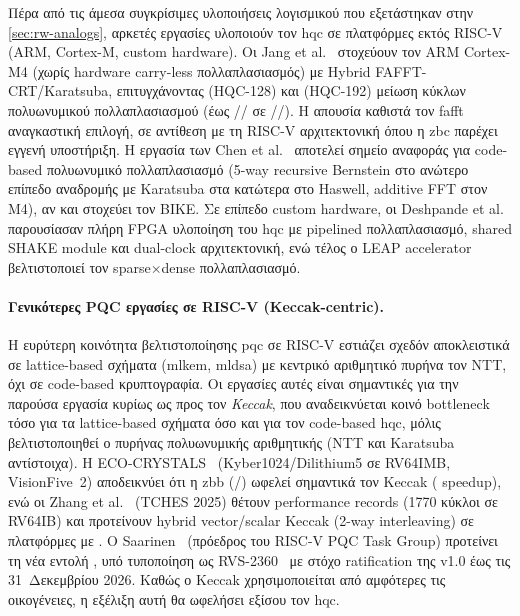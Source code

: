 Πέρα από τις άμεσα συγκρίσιμες υλοποιήσεις λογισμικού που εξετάστηκαν στην \cref{sec:rw-analogs}, αρκετές εργασίες
υλοποιούν τον \gls{hqc} σε πλατφόρμες εκτός RISC-V (ARM, Cortex-M, custom hardware). Οι Jang et
al.~\cite{Jang2025-CortexM4-HQC} στοχεύουν τον ARM Cortex-M4 (χωρίς hardware
carry-less πολλαπλασιασμός) με Hybrid FAFFT-CRT/Karatsuba, επιτυγχάνοντας 
(HQC-128) και  (HQC-192) μείωση κύκλων πολυωνυμικού πολλαπλασιασμού (έως
// σε \KeyGen/\Encaps/\Decaps). Η απουσία 
καθιστά τον \gls{fafft} αναγκαστική επιλογή, σε αντίθεση με τη RISC-V
αρχιτεκτονική όπου η \gls{zbc} παρέχει εγγενή υποστήριξη. Η εργασία των Chen et
al.~\cite{Chen2021-BIKE-Haswell-M4} αποτελεί σημείο αναφοράς για code-based
πολυωνυμικό πολλαπλασιασμό (5-way recursive Bernstein στο ανώτερο επίπεδο
αναδρομής με Karatsuba στα κατώτερα στο Haswell, additive FFT στον M4), αν και
στοχεύει τον BIKE. Σε επίπεδο custom hardware, οι Deshpande
et al.~\cite{Deshpande2023-HQC-HW} παρουσίασαν πλήρη FPGA υλοποίηση του \gls{hqc}
με pipelined πολλαπλασιασμό, shared SHAKE module και dual-clock αρχιτεκτονική, ενώ τέλος ο LEAP
accelerator~\cite{LEAP2024-sparse-polymul} βελτιστοποιεί τον sparse$\times$dense
πολλαπλασιασμό. 

\paragraph{Γενικότερες PQC εργασίες σε RISC-V (Keccak-centric).}
\label{ssec:rw-pqc-riscv}

Η ευρύτερη κοινότητα βελτιστοποίησης \gls{pqc} σε RISC-V εστιάζει σχεδόν
αποκλειστικά σε lattice-based σχήματα (\gls{mlkem}, \gls{mldsa}) με κεντρικό
αριθμητικό πυρήνα τον NTT, όχι σε code-based κρυπτογραφία. Οι εργασίες αυτές
είναι σημαντικές για την παρούσα εργασία κυρίως ως προς τον 
\emph{Keccak}, που αναδεικνύεται κοινό bottleneck τόσο για τα 
lattice-based σχήματα όσο και για τον code-based \gls{hqc}, μόλις 
βελτιστοποιηθεί ο πυρήνας πολυωνυμικής αριθμητικής (NTT και Karatsuba 
αντίστοιχα). Η ECO-CRYSTALS~\cite{Ji2024-ECO-CRYSTALS}
(Kyber1024/Dilithium5 σε RV64IMB, VisionFive~2) αποδεικνύει ότι η \gls{zbb}
(\rori/) ωφελεί σημαντικά τον Keccak ( speedup), ενώ οι
Zhang et al.~\cite{zhang-tches2025} (TCHES 2025) θέτουν performance records
(\num{1770} κύκλοι σε RV64IB) και προτείνουν hybrid vector/scalar Keccak
(2-way interleaving) σε πλατφόρμες με \RVV. Ο Saarinen~\cite{Saarinen2024-vkeccak}
(πρόεδρος του RISC-V PQC Task Group) προτείνει τη νέα εντολή 
, υπό τυποποίηση ως 
RVS-2360~\cite{RISCV-PQC-Keccak-Plan2026} με στόχο ratification της 
v1.0 έως τις 31~Δεκεμβρίου 2026. Καθώς ο Keccak χρησιμοποιείται από 
αμφότερες τις οικογένειες, η εξέλιξη αυτή θα ωφελήσει εξίσου τον \gls{hqc}.
